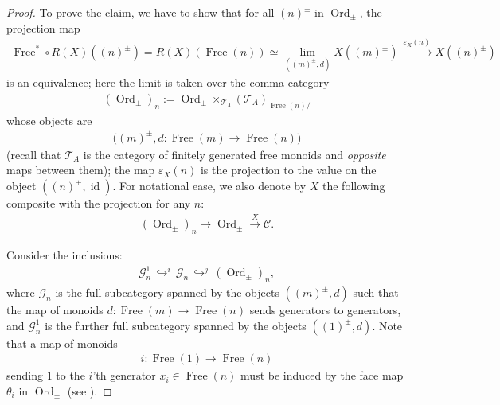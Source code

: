 \documentclass[12pt, reqno]{amsart}
\theoremstyle{plain}
\theoremstyle{definition}
\renewcommand{\epsilon}{\varepsilon}
\begin{document}
\begin{proof}
To prove the claim, we have to show that for all $(n)^\pm$ in $\operatorname{Ord}_\pm$, the projection map
\begin{align*}
\operatorname{Free}^*\circ R(X)((n)^\pm)=R(X)(\operatorname{Free}(n))\simeq \mathop{\operatorname{lim}}_{((m)^\pm,d)} X((m)^\pm )\xrightarrow{\ \epsilon_X(n)\ } X((n)^\pm)
\end{align*}
is an equivalence; here the limit is taken over the comma category
\begin{align*}
(\operatorname{Ord}_\pm)_n:=\operatorname{Ord}_\pm \mathop{\times}_{\mathcal{T}_A} (\mathcal{T}_A)_{\operatorname{Free}(n)/}
\end{align*}
whose objects are
\begin{align*}
\big((m)^\pm, d\colon\operatorname{Free}(m)\rightarrow \operatorname{Free}(n)\big)
\end{align*}
(recall that $\mathcal{T}_A$ is the category of finitely generated free monoids and \textit{opposite} maps between them); the map $\epsilon_X(n)$ is the projection to the value on the object $((n)^\pm,\operatorname{id})$. For notational ease, we also denote by $X$  the following composite with the projection for any $n$:
\begin{align*}
(\operatorname{Ord}_\pm)_n\rightarrow \operatorname{Ord}_\pm \xrightarrow{X} \mathcal{C}.
\end{align*}

Consider the inclusions:
\begin{align*}
\mathcal{G}_n^1\,\mathop{\hookrightarrow}^{i} \,\mathcal{G}_n\,\mathop{\hookrightarrow}^{j}\,(\operatorname{Ord}_\pm)_n,
\end{align*}
where $\mathcal{G}_n$ is  the full subcategory spanned by the objects $((m)^\pm,d)$ such that the map of monoids $d\colon \operatorname{Free}(m)\rightarrow \operatorname{Free}(n)$ sends generators to generators, and $\mathcal{G}_n^1$ is the further full subcategory spanned by the objects $((1)^\pm,d)$. Note that a map of monoids
\begin{align*}
i\colon \operatorname{Free}(1)\rightarrow \operatorname{Free}(n)
\end{align*}
sending $1$ to the $i$'th generator $x_i\in \operatorname{Free}(n)$ must be induced by the face map $\theta_i$ in $\operatorname{Ord}_\pm$ (see ).


\end{proof}
\end{document}
